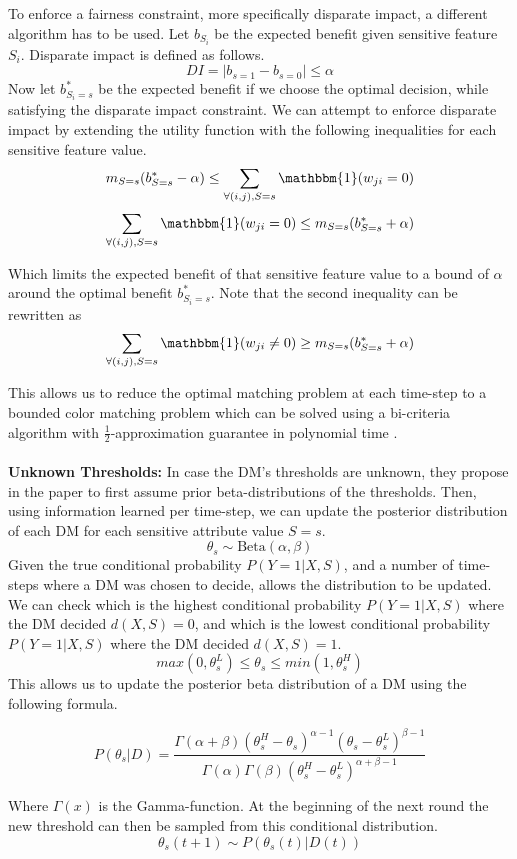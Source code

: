 \documentclass[11pt,a4paper,final]{article}
\begin{document}
To enforce a fairness constraint, more specifically disparate impact, a different algorithm has to be used. Let $b_{S_i}$ be the expected benefit given sensitive feature $S_i$. Disparate impact is defined as follows.
$$DI=|b_{s=1}-b_{s=0}|\le \alpha$$
Now let $b^*_{S_i=s}$ be the expected benefit if we choose the optimal decision, while satisfying the disparate impact constraint. We can attempt to enforce disparate impact by extending the utility function with the following inequalities for each sensitive feature value.
$$ m_{S=s}(b_{S=s}^*-\alpha)\le \sum_{\forall (i,j), S=s}\mathbbm{1} (w_{ji}= 0)$$
$$\sum_{\forall (i,j), S=s}\mathbbm{1} (w_{ji}= 0) \le  m_{S=s}(b_{S=s}^*+\alpha)$$

Which limits the expected benefit of that sensitive feature value to a bound of $\alpha$ around the optimal benefit $b^*_{S_i=s}$.
Note that the second inequality can be rewritten as
$$\sum_{\forall (i,j), S=s}\mathbbm{1} (w_{ji}\ne 0) \ge m_{S=s}(b_{S=s}^*+\alpha)$$

This allows us to reduce the optimal matching problem at each time-step to a bounded color matching problem which can be solved using a bi-criteria algorithm with $\frac{1}{2}$-approximation guarantee in polynomial time \citep{MastrolilliS13}.
\\
\\
\textbf{Unknown Thresholds: } In case the DM's thresholds are unknown, they propose in the paper to first assume prior beta-distributions of the thresholds. Then, using information learned per time-step, we can update the posterior distribution of each DM for each sensitive attribute value $S=s$.
$$\theta_s\sim \text{Beta}(\alpha,\beta)$$
Given the true conditional probability $P(Y=1|X,S)$, and a number of time-steps where a DM was chosen to decide, allows the distribution to be updated. We can check which is the highest conditional probability $P(Y=1|X,S)$ where the DM decided $d(X,S)=0$, and which is the lowest conditional probability $P(Y=1|X,S)$ where the DM decided $d(X,S)=1$.
$$max(0,\theta^L_s)\le \theta_s \le min(1,\theta^H_s )$$
This allows us to update the posterior beta distribution of a DM using the following formula.

$$P(\theta_s | D)=\frac{\Gamma(\alpha+\beta)(\theta^H_s-\theta_s)^{\alpha-1}(\theta_s-\theta^L_s)^{\beta-1}}{\Gamma(\alpha)\Gamma(\beta)(\theta^H_s-\theta^L_s)^{\alpha+\beta-1}}$$ 

Where $\Gamma(x)$ is the Gamma-function. At the beginning of the next round the new threshold can then be sampled from this conditional distribution. $$\theta_s(t+1)\sim P(\theta_s(t)|D(t))$$
\end{document}
